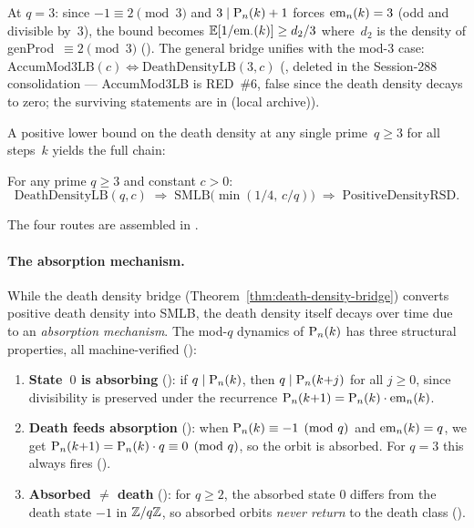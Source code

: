 \noindent At $q = 3$: since $-1 \equiv 2 \pmod{3}$ and $3 \mid
\mathrm{P}_{n}(k)+1$ forces $\mathrm{em}_{n}(k) = 3$ (odd
and divisible by~$3$), the bound becomes
$\mathbb{E}[1/\mathrm{em}_{\cdot}(k)] \geq d_2/3$ where~$d_2$ is the
density of genProd~$\equiv 2 \pmod{3}$
().
The general bridge unifies with the mod-3 case:
$\mathrm{AccumMod3LB}(c) \Leftrightarrow
\mathrm{DeathDensityLB}(3, c)$
(, deleted in the Session-288
consolidation --- AccumMod3LB is RED~\#6, false since the death density
decays to zero; the surviving statements are in
 (local archive)).

A positive lower bound on the death density at any single
prime~$q \geq 3$ for all steps~$k$ yields the full chain:

\begin{theorem}
\label{thm:death-density-prsd}
For any prime $q \geq 3$ and constant $c > 0$:
\[
  \mathrm{DeathDensityLB}(q, c)
  \;\Longrightarrow\;
  \mathrm{SMLB}\bigl(\min(1/4,\, c/q)\bigr)
  \;\Longrightarrow\;
  \mathrm{PositiveDensityRSD}.
\]
\end{theorem}

\noindent The four routes are assembled in
.

\paragraph{The absorption mechanism.}
\label{sec:absorption}
While the death density bridge (Theorem~\ref{thm:death-density-bridge})
converts positive death density into SMLB, the death density itself
decays over time due to an \emph{absorption mechanism}.  The mod-$q$
dynamics of $\mathrm{P}_{n}(k)$ has three structural properties, all
machine-verified
():

\begin{enumerate}[nosep]
\item \textbf{State~$0$ is absorbing}
  ():
  if $q \mid \mathrm{P}_{n}(k)$, then $q \mid \mathrm{P}_{n}(k{+}j)$ for all $j \geq 0$,
  since divisibility is preserved under the recurrence
  $\mathrm{P}_{n}(k{+}1) = \mathrm{P}_{n}(k) \cdot \mathrm{em}_{n}(k)$.
\item \textbf{Death feeds absorption}
  ():
  when $\mathrm{P}_{n}(k) \equiv -1 \pmod{q}$ and $\mathrm{em}_{n}(k) = q$,
  we get $\mathrm{P}_{n}(k{+}1) = \mathrm{P}_{n}(k) \cdot q \equiv 0 \pmod{q}$,
  so the orbit is absorbed.
  For $q = 3$ this always fires
  ().
\item \textbf{Absorbed $\neq$ death}
  ():
  for $q \geq 2$, the absorbed state $0$ differs from the death
  state $-1$ in $\mathbb{Z}/q\mathbb{Z}$, so absorbed orbits \emph{never return} to
  the death class
  ().
\end{enumerate}

